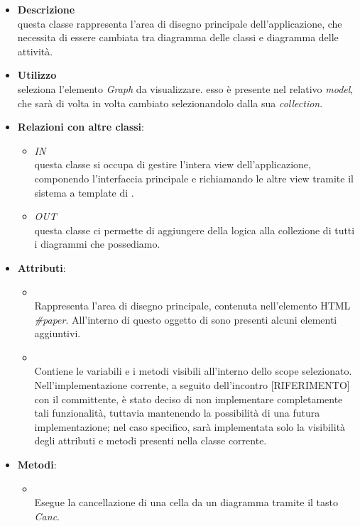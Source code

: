 \label{\nogloxy{swedesigner::client::view::ProjectView}}
\begin{itemize}
\item \textbf{Descrizione}\\
questa classe rappresenta l'area di disegno principale dell'applicazione, che necessita di essere cambiata tra diagramma delle classi e diagramma delle attività. 
\item \textbf{Utilizzo}\\
seleziona l'elemento \emph{Graph} da visualizzare. esso è presente nel relativo \emph{model}, che sarà di volta in volta cambiato selezionandolo dalla sua \emph{collection}.
\item \textbf{Relazioni con altre classi}:
\begin{itemize}
\item \textit{IN} \hyperref[\nogloxy{swedesigner::client::view::AppView}]{}\\
questa classe si occupa di gestire l'intera view dell'applicazione, componendo l'interfaccia principale e richiamando le altre view tramite il sistema a template di \backbonejs{}.
\item \textit{OUT} \hyperref[\nogloxy{swedesigner::client::model::ProjectModel}]{}\\
questa classe ci permette di aggiungere della logica alla collezione di tutti i diagrammi che possediamo.
\end{itemize}
\item \textbf{Attributi}:
\begin{itemize}
\item {}
\\ Rappresenta l'area di disegno principale, contenuta nell'elemento HTML \emph{\#paper}.
All'interno di questo oggetto di \jointjs{} sono presenti alcuni elementi aggiuntivi.
\item {}
\\ Contiene le variabili e i metodi visibili all'interno dello scope selezionato. Nell'implementazione corrente, a seguito dell'incontro [RIFERIMENTO] con il committente, è stato deciso di non implementare completamente tali funzionalità, tuttavia mantenendo la possibilità di una futura implementazione; nel caso specifico, sarà implementata solo la visibilità degli attributi e metodi presenti nella classe corrente.
\end{itemize}
\item \textbf{Metodi}:
\begin{itemize}
\item {}
\\ Esegue la cancellazione di una cella da un diagramma tramite il tasto \emph{Canc}.


\end{itemize}
\end{itemize}
